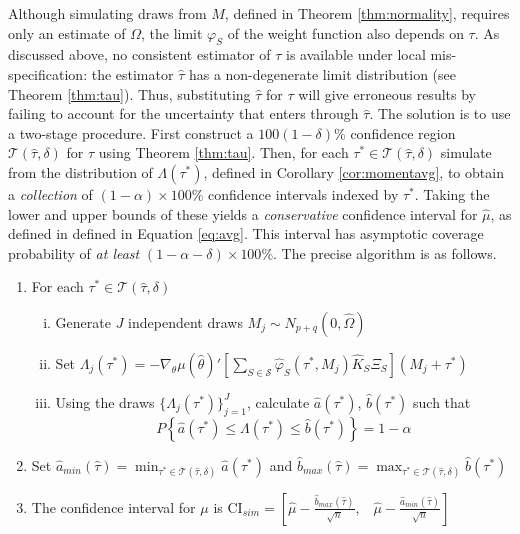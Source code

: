 Although simulating draws from $M$, defined in Theorem \ref{thm:normality}, requires only an estimate of $\Omega$, the limit $\varphi_S$ of the weight function also depends on $\tau$. 
As discussed above, no consistent estimator of $\tau$ is available under local mis-specification: the estimator $\widehat{\tau}$ has a non-degenerate limit distribution (see Theorem \ref{thm:tau}). 
Thus, substituting $\widehat{\tau}$ for $\tau$ will give erroneous results by failing to account for the uncertainty that enters through $\widehat{\tau}$. 
The solution is to use a two-stage procedure. 
First construct a  $100(1-\delta)\%$ confidence region $\mathscr{T}(\widehat{\tau},\delta)$ for $\tau$ using Theorem \ref{thm:tau}. 
Then, for each $\tau^* \in \mathscr{T}(\widehat{\tau},\delta)$ simulate from the distribution of $\Lambda(\tau^*)$, defined in Corollary \ref{cor:momentavg}, to obtain a \emph{collection} of $(1-\alpha)\times 100\%$ confidence intervals indexed by $\tau^*$. 
Taking the lower and upper bounds of these yields a \emph{conservative} confidence interval for $\widehat{\mu}$, as defined in defined in Equation \ref{eq:avg}. 
This interval has asymptotic coverage probability of \emph{at least} $(1-\alpha-\delta)\times 100\%$.
The precise algorithm is as follows.
\begin{alg}
\label{alg:conf}
\mbox{}
\begin{enumerate}
	\item For each $\tau^* \in \mathscr{T}(\widehat{\tau},\delta)$ 
		\begin{enumerate}[(i)]
			\item Generate $J$ independent draws $M_j \sim N_{p+q}( 0, \widehat{\Omega} )$
			\item Set $\Lambda_j(\tau^*) = -\nabla_\theta\mu(\widehat{\theta})'\left[\sum_{S \in \mathscr{S}} \widehat{\varphi}_S(\tau^*,M_j) \widehat{K}_S\Xi_S\right] (M_j + \tau^*)$
			\item Using the draws $\{\Lambda_j(\tau^*)\}_{j=1}^J$, calculate $\widehat{a}(\tau^*)$, $\widehat{b}(\tau^*)$ such that
		$$P\left\{ \widehat{a}(\tau^*) \leq\Lambda(\tau^*)\leq \widehat{b}(\tau^*) \right\} = 1 - \alpha$$
		\end{enumerate}
	\item Set $\displaystyle \widehat{a}_{min}(\widehat{\tau})=\min_{\tau^* \in \mathscr{T}(\widehat{\tau},\delta)} \widehat{a}(\tau^*)$ and $\displaystyle \widehat{b}_{max}(\widehat{\tau})= \max_{\tau^* \in \mathscr{T}(\widehat{\tau},\delta)} \widehat{b}(\tau^*)$ \vspace{0.5em}
	\item The confidence interval for $\mu$ is
				$\displaystyle \mbox{CI}_{sim}=\left[ \widehat{\mu} - \frac{\widehat{b}_{max}(\widehat{\tau})}{\sqrt{n}}, \;\;\; \widehat{\mu} - \frac{\widehat{a}_{min}(\widehat{\tau})}{\sqrt{n}} \right]$
\end{enumerate}
\end{alg}

